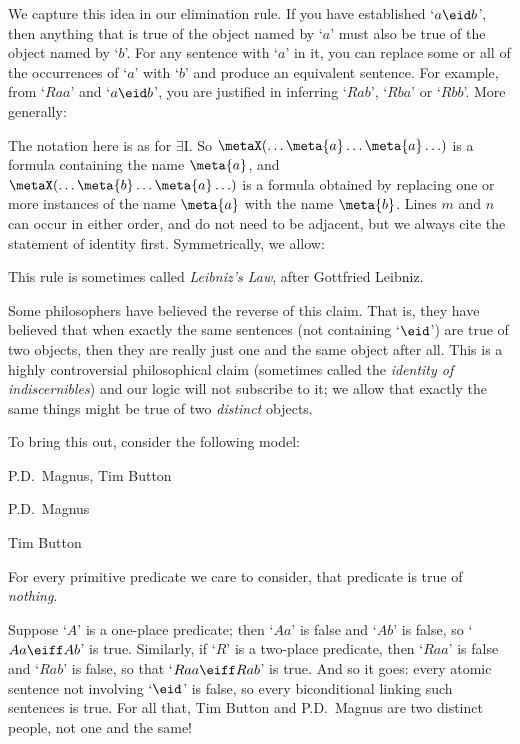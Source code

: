 We capture this idea in our elimination rule. If you have established `$a\eid b$', then anything that is true of the object named by `$a$' must also be true of the object named by `$b$'. For any sentence with `$a$' in it, you can replace some or all of the occurrences of `$a$' with `$b$' and produce an equivalent sentence. For example, from `$Raa$' and `$a \eid  b$', you are justified in inferring `$Rab$', `$Rba$' or `$Rbb$'. More generally:
\begin{highlighted}\begin{fitchproof}
	 
\end{fitchproof}\end{highlighted}
The notation here is as for $\exists$I. So $\metaX(\ldots \meta{a} \ldots \meta{a}\ldots)$ is a formula containing the name $\meta{a}$, and $\metaX(\ldots \meta{b} \ldots \meta{a}\ldots)$ is a formula obtained by replacing one or more instances of the name $\meta{a}$ with the name $\meta{b}$. Lines $m$ and $n$ can occur in either order, and do not need to be adjacent, but we always cite the statement of identity first. Symmetrically, we allow:
\begin{highlighted}\begin{fitchproof}
	 
\end{fitchproof}\end{highlighted}
This rule is sometimes called \emph{Leibniz's Law}, after Gottfried Leibniz.

Some philosophers have believed the reverse of this claim. That is, they have believed that when exactly the same sentences (not containing `$\eid $') are true of two objects, then they are really just one and the same object after all. This is a highly controversial philosophical claim (sometimes called the \emph{identity of indiscernibles}) and our logic will not subscribe to it; we allow that exactly the same things might be true of two \emph{distinct} objects.

To bring this out, consider the following model:
	\begin{ebullet}
		\item[\text{domain}:] P.D.\ Magnus, Tim Button
		\item[$a$:] P.D.\ Magnus
		\item[$b$:] Tim Button
		\item For every primitive predicate we care to consider, that predicate is true of \emph{nothing}.
	\end{ebullet}
Suppose `$A$' is a one-place predicate; then `$Aa$' is false and `$Ab$' is false, so `$Aa \eiff Ab$' is true. Similarly, if `$R$' is a two-place predicate, then `$Raa$' is false and `$Rab$' is false, so that `$Raa \eiff Rab$' is true. And so it goes: every atomic sentence not involving `$\eid $' is false, so every biconditional linking such sentences is true. For all that, Tim Button and P.D.\ Magnus are two distinct people, not one and the same!

